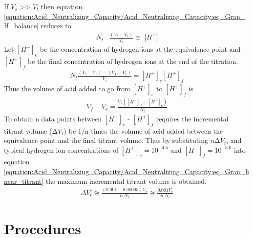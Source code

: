\documentclass[letterpaper,10pt,english]{sphinxmanual}
\begin{document}
If \(V_s\) \textgreater{}\textgreater{} \(V_t\) then equation \eqref{equation:Acid_Neutralizing_Capacity/Acid_Neutralizing_Capacity:eq_Gran_H_balance} reduces to
\begin{equation}\label{equation:Acid_Neutralizing_Capacity/Acid_Neutralizing_Capacity:Acid_Neutralizing_Capacity/Acid_Neutralizing_Capacity:4}
\begin{split}{N}_{{t}} {\; \; \; }\frac{(V_{t} -V_{e} )}{V_{s} } \cong {\; [H}^{+} {]}\end{split}
\end{equation}
Let \([H^+]_e\) be the concentration of hydrogen ions at the equivalence point and \([H^+]_f\) be the final concentration of hydrogen ions at the end of the titration.
\begin{equation}\label{equation:Acid_Neutralizing_Capacity/Acid_Neutralizing_Capacity:Acid_Neutralizing_Capacity/Acid_Neutralizing_Capacity:5}
\begin{split}N_t \frac{(V_e - V_e)-(V_f - V_e)}{V_s} =[H^+]_e [H^+]_f\end{split}
\end{equation}
Thus the volume of acid added to go from \([H^+]_e\) to \([H^+]_f\) is
\begin{equation}\label{equation:Acid_Neutralizing_Capacity/Acid_Neutralizing_Capacity:eq_Gran_linear_titrant}
\begin{split} V_f - V_e =\frac{V_s \left([H^+]_f -[H^+]_e \right)}{N_t}\end{split}
\end{equation}
To obtain n data points between \([H^+]_e\) - \([H^+]_f\) requires the incremental titrant volume (\(\mathrm{\Delta} V_t\)) be 1/n times the volume of acid added between the equivalence point and the final titrant volume. Thus by substituting \(n\mathrm{\Delta}V_t\), and typical hydrogen ion concentrations of \([H^+]_e = 10^{-4.5}\) and \([H^+]_f = 10^{-3.0}\) into equation \eqref{equation:Acid_Neutralizing_Capacity/Acid_Neutralizing_Capacity:eq_Gran_linear_titrant} the maximum incremental titrant volume is obtained.
\begin{equation}\label{equation:Acid_Neutralizing_Capacity/Acid_Neutralizing_Capacity:Acid_Neutralizing_Capacity/Acid_Neutralizing_Capacity:6}
\begin{split}\Delta V_t\cong \frac{(0.001-0.00003)V_s }{n\; N_t} \cong \frac{0.001V_s}{n\; N_t}\end{split}
\end{equation}

\section{Procedures}
\label{\detokenize{Acid_Neutralizing_Capacity/Acid_Neutralizing_Capacity:procedures}}\label{\detokenize{Acid_Neutralizing_Capacity/Acid_Neutralizing_Capacity:heading-anc-procedures}}
\end{document}
